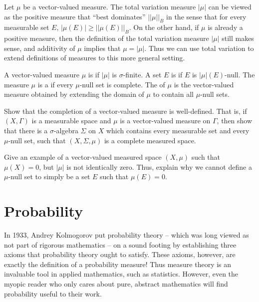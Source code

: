 \begin{subsec}
Let $\mu$ be a vector-valued measure.
The total variation measure $|\mu|$ can be viewed as the positive measure that ``best dominates'' $||\mu||_B$ in the sense that for every measurable set $E$, $|\mu(E)| \geq ||\mu(E)||_B$.
On the other hand, if $\mu$ is already a positive measure, then the definition of the total variation measure $|\mu|$ still makes sense, and additivity of $\mu$ implies that $\mu = |\mu|$.
Thus we can use total variation to extend definitions of measures to this more general setting.
\end{subsec}

\begin{definition}
A vector-valued measure $\mu$ is  if $|\mu|$ is $\sigma$-finite.
A set $E$ is  if $E$ is $|\mu|(E)$-null.
The measure $\mu$ is a  if every $\mu$-null set is complete.
The  of $\mu$ is the vector-valued measure obtained by extending the domain of $\mu$ to contain all $\mu$-null sets.
\end{definition}

\begin{exercise}
Show that the completion of a vector-valued measure is well-defined.
That is, if $(X, \Gamma)$ is a measurable space and $\mu$ is a vector-valued measure on $\Gamma$, then show that there is a $\sigma$-algebra $\Sigma$ on $X$ which contains every measurable set and every $\mu$-null set, such that $(X, \Sigma, \mu)$ is a complete measured space.
\end{exercise}

\begin{exercise}
Give an example of a vector-valued measured space $(X, \mu)$ such that $\mu(X) = 0$, but $|\mu|$ is not identically zero.
Thus, explain why we cannot define a $\mu$-null set to simply be a set $E$ such that $\mu(E) = 0$.
\end{exercise}


\section{Probability}
In 1933, Andrey Kolmogorov put probability theory -- which was long viewed as not part of rigorous mathematics -- on a sound footing by establishing three axioms that probability theory ought to satisfy.
These axioms, however, are exactly the definition of a probability measure!
Thus measure theory is an invaluable tool in applied mathematics, such as statistics.
However, even the myopic reader who only cares about pure, abstract mathematics will find probability useful to their work.

